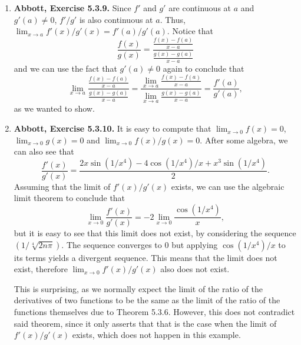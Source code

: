 \documentclass{article}
\newcommand{\exc}[2][Abbott]{\item \textbf{#1, Exercise #2.}}
\let\oldsin\sin
\let\oldcos\cos
\renewcommand{\sin}[1]{\oldsin \left( #1 \right)}
\renewcommand{\cos}[1]{\oldcos \left( #1 \right)}
\begin{document}
\begin{enumerate}
    \exc{5.3.9}
    Since $f'$ and $g'$ are continuous at $a$ and $g'(a) \neq 0$, $f'/g'$ is also continuous at $a$. Thus, $\lim_{x \to a} f'(x)/g'(x) = f'(a)/g'(a)$. 
    Notice that 
    \begin{equation*}
       \frac{f(x)}{g(x)} = \frac{\frac{f(x)-f(a)}{x-a}}{\frac{g(x)-g(a)}{x-a}}
    \end{equation*} and we can use the fact that $g'(a) \neq 0$ again to conclude that 
    \begin{equation*}
        \lim_{x \to a}\frac{\frac{f(x)-f(a)}{x-a}}{\frac{g(x)-g(a)}{x-a}} = 
        \frac{\lim_{x \to a} \frac{f(x)-f(a)}{x-a}}{\lim_{x \to a}\frac{g(x)-g(a)}{x-a}} = \frac{f'(a)}{g'(a)},
    \end{equation*} as we wanted to show.
    
    \exc{5.3.10}
    It is easy to compute that $\lim_{x \to 0} f(x) = 0$, $\lim_{x \to 0} g(x) = 0$ and $\lim_{x \to 0} f(x)/g(x) = 0$. After some algebra, we can also see that 
    \begin{equation*}
        \frac{f'(x)}{g'(x)} = \frac{2x \sin{1/x^4}-4\cos{1/x^4}/x + x^3 \sin{1/x^4}}{2}.
    \end{equation*} Assuming that the limit of $f'(x)/g'(x)$ exists, we can use the algebraic limit theorem to conclude that 
    \begin{equation*}
        \lim_{x \to 0} \frac{f'(x)}{g'(x)} = -2 \lim_{x \to 0} \frac{\cos{1/x^4}}{x},
    \end{equation*} but it is easy to see that this limit does not exist, by considering the sequence $(1/\sqrt[4]{2 n \pi})$. The sequence converges to $0$ but applying $\cos{1/x^4}/x$ to its terms yields a divergent sequence. This means that the limit does not exist, therefore $\lim_{x \to 0} f'(x)/g'(x)$ also does not exist.
    
    This is surprising, as we normally expect the limit of the ratio of the derivatives of two functions to be the same as the limit of the ratio of the functions themselves due to Theorem 5.3.6. However, this does not contradict said theorem, since it only asserts that that is the case when the limit of $f'(x)/g'(x)$ exists, which does not happen in this example.
    

\end{enumerate}
\end{document}
